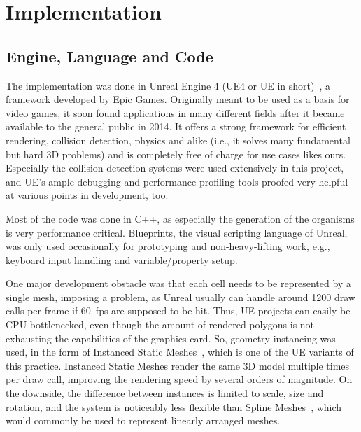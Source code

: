 \documentclass[11pt, abstract=on]{scrartcl}
\begin{document}
\section{Implementation}
\subsection{Engine, Language and Code}
The implementation was done in Unreal Engine 4 (UE4 or UE in short)~\cite{WhatIsUnreal}, a framework developed by Epic Games. Originally meant to be used as a basis for video games, it soon found applications in many different fields after it became available to the general public in 2014. It offers a strong framework for efficient rendering, collision detection, physics and alike (i.e., it solves many fundamental but hard 3D problems) and is completely free of charge for use cases likes ours. Especially the collision detection systems were used extensively in this project, and UE's ample debugging and performance profiling tools proofed very helpful at various points in development, too. 

Most of the code was done in C++, as especially the generation of the organisms is very performance critical. Blueprints, the visual scripting language of Unreal, was only used occasionally for prototyping and non-heavy-lifting work, e.g., keyboard input handling and variable/property setup.

One major development obstacle was that each cell needs to be represented by a single mesh, imposing a problem, as Unreal usually can handle around 1200 draw calls per frame if 60~fps are supposed to be hit. Thus, UE projects can easily be CPU-bottlenecked, even though the amount of rendered polygons is not exhausting the capabilities of the graphics card. So, geometry instancing was used, in the form of Instanced Static Meshes~\cite{UEInstancing}, which is one of the UE variants of this practice. Instanced Static Meshes render the same 3D model multiple times per draw call, improving the rendering speed by several orders of magnitude. On the downside, the difference between instances is limited to scale, size and rotation, and the system is noticeably less flexible than Spline Meshes~\cite{UESplines}, which would commonly be used to represent linearly arranged meshes.
\end{document}
